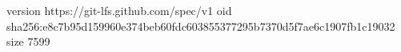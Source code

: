 version https://git-lfs.github.com/spec/v1
oid sha256:e8c7b95d159960e374beb60fdc603855377295b7370d5f7ae6c1907fb1c19032
size 7599
